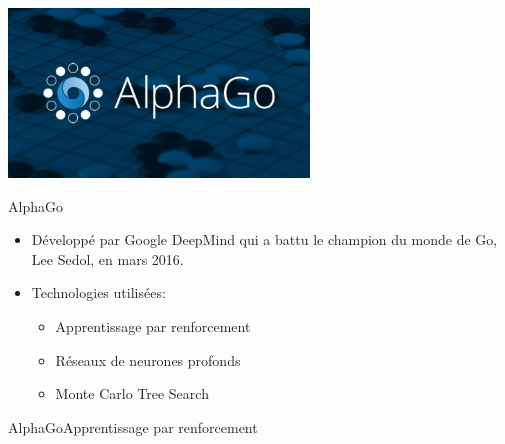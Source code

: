 \begin{frame}
	\begin{center}
		\includegraphics[width=8cm]{ressources/AlphaGoLogo}

	\end{center}
\end{frame}


\begin{frame}{AlphaGo}
	\begin{itemize}
		\item Développé par Google DeepMind qui a battu le champion du monde de Go, Lee Sedol, en mars 2016.
		\item Technologies utilisées:
		      \begin{itemize}
			      \item Apprentissage par renforcement
			      \item Réseaux de neurones profonds\item Monte Carlo Tree Search
		      \end{itemize}
	\end{itemize}
\end{frame}


\begin{frame}{AlphaGo}{Apprentissage par renforcement}



\end{frame}
